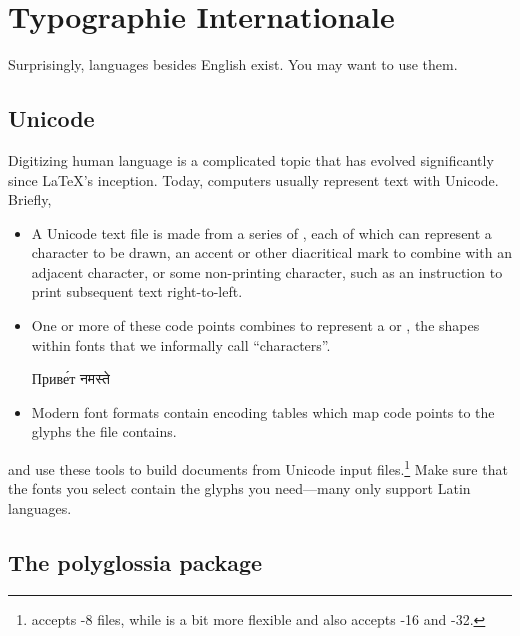 \chapter{Typographie Internationale}
\label{i18n}

Surprisingly, languages besides English exist.
You may want to use them.

\section{Unicode}

Digitizing human language is a complicated topic that has evolved significantly
since \LaTeX's inception.
Today, computers usually represent text with Unicode. Briefly,
\begin{itemize}
\item A Unicode text file is made from a series of ,
    each of which can represent a character to be drawn,
    an accent or other diacritical mark to combine with an adjacent
    character,
    or some non-printing character,
    such as an instruction to print subsequent text right-to-left.
\item One or more of these code points combines to represent a
     or ,
    the shapes within fonts that we informally call ``characters''\quotekern.
\begin{centerfigure}
\large%
%
Приве́т
\quad{}%
नमस्ते
\end{centerfigure}
\item Modern font formats contain encoding tables
    which map code points to the glyphs the file contains.
\end{itemize}
\LuaLaTeX{} and \XeLaTeX{} use these tools to build documents
from Unicode input
files.\punckern\footnote{\LuaLaTeX{} accepts \mbox{-8} files,
while \XeLaTeX{} is a bit more flexible and also
accepts \mbox{-16} and
\mbox{-32}.}
Make sure that the fonts you select contain the glyphs you need---many
only support Latin languages.

\section{The polyglossia package}


